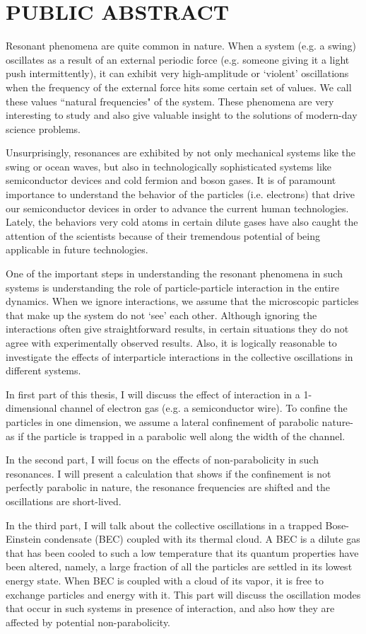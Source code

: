 \chapter*{PUBLIC ABSTRACT}
{
Resonant phenomena are quite common in nature. When a system (e.g. a swing) oscillates as a result of an external periodic force (e.g. someone giving it a light push intermittently), it can exhibit very high-amplitude or `violent' oscillations when the frequency of the external force hits some certain set of values. We call these values ``natural frequencies" of the system. These phenomena are very interesting to study and also give valuable insight to the solutions of modern-day science problems.

Unsurprisingly, resonances are exhibited by not only mechanical systems like the swing or ocean waves, but also in technologically sophisticated systems like semiconductor devices and cold fermion and boson gases. It is of paramount importance to understand the behavior of the particles (i.e. electrons) that drive our semiconductor devices in order to advance the current human technologies. Lately, the behaviors very cold atoms in certain dilute gases have also caught the attention of the scientists because of their tremendous potential of being applicable in future technologies.

One of the important steps in understanding the resonant phenomena in such systems is understanding the role of particle-particle interaction in the entire dynamics. When we ignore interactions, we assume that the microscopic particles that make up the system do not `see' each other. Although ignoring the interactions often give straightforward results, in certain situations they do not agree with experimentally observed results. Also, it is logically reasonable to investigate the effects of interparticle interactions in the collective oscillations in different systems.

In first part of this thesis, I will discuss the effect of interaction in a 1-dimensional channel of electron gas (e.g. a semiconductor wire). To confine the particles in one dimension, we assume a lateral confinement of parabolic nature- as if the particle is trapped in a parabolic well along the width of the channel.

In the second part, I will focus on the effects of non-parabolicity in such resonances. I will present a calculation that shows if the confinement is not perfectly parabolic in nature, the resonance frequencies are shifted and the oscillations are short-lived.

In the third part, I will talk about the collective oscillations in a trapped Bose-Einstein condensate (BEC) coupled with its thermal cloud. A BEC is a dilute gas that has been cooled to such a low temperature that its quantum properties have been altered, namely, a large fraction of all the particles are settled in its lowest energy state. When BEC is coupled with a cloud of its vapor, it is free to exchange particles and energy with it. This part will discuss the oscillation modes that occur in such systems in presence of interaction, and also how they are affected by potential non-parabolicity.
}





\afterpreface
